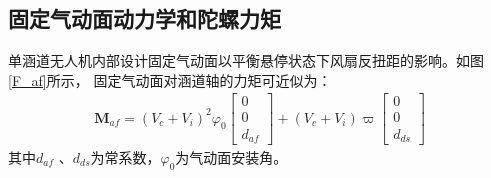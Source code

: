 \subsection{固定气动面动力学和陀螺力矩}
单涵道无人机内部设计固定气动面以平衡悬停状态下风扇反扭距的影响。如图\ref{F_af}所示，
固定气动面对涵道轴的力矩可近似为：
\begin{align}\bm{M}_{a f}=\left(V_{c}+V_{i}\right)^{2} \varphi_{0}\left[\begin{array}{c}
0 \\
0 \\
d_{a f}
\end{array}\right]+\left(V_{c}+V_{i}\right) \varpi \left[\begin{array}{c}
0 \\
0 \\
d_{d s}
\end{array}\right]	\label{M_af}
\end{align}
其中$ d_{af} $ 、$ d_{ds} $为常系数，$ \varphi_0 $为气动面安装角。

